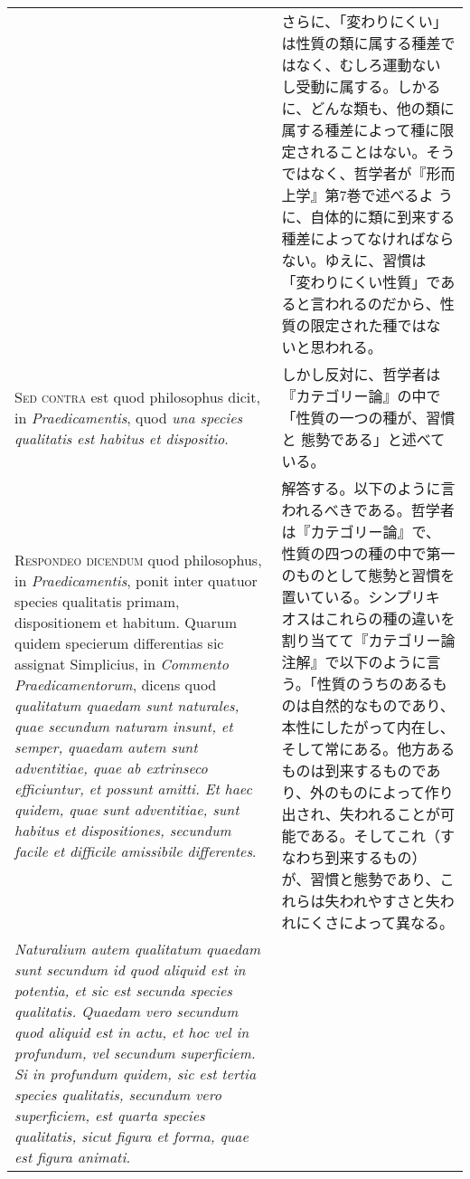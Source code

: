 \documentclass[10pt]{jsarticle} %
\begin{document}
\begin{longtable}{p{21em}p{21em}}
&

さらに、「変わりにくい」は性質の類に属する種差ではなく、むしろ運動ない
し受動に属する。しかるに、どんな類も、他の類に属する種差によって種に限
定されることはない。そうではなく、哲学者が『形而上学』第7巻で述べるよ
うに、自体的に類に到来する種差によってなければならない。ゆえに、習慣は
「変わりにくい性質」であると言われるのだから、性質の限定された種ではな
いと思われる。

\\



{\scshape Sed contra} est quod philosophus dicit, in {\itshape Praedicamentis}, quod {\itshape una
species qualitatis est habitus et dispositio}.

&

しかし反対に、哲学者は『カテゴリー論』の中で「性質の一つの種が、習慣と
態勢である」と述べている。

\\



{\scshape Respondeo dicendum} quod philosophus, in {\itshape Praedicamentis}, ponit inter
quatuor species qualitatis primam, dispositionem et habitum. Quarum
quidem specierum differentias sic assignat Simplicius, in {\itshape Commento
Praedicamentorum}, dicens quod {\itshape qualitatum quaedam sunt naturales, quae
secundum naturam insunt, et semper, quaedam autem sunt adventitiae,
quae ab extrinseco efficiuntur, et possunt amitti. Et haec quidem,
quae sunt adventitiae, sunt habitus et dispositiones, secundum facile
et difficile amissibile differentes}. 


&

解答する。以下のように言われるべきである。哲学者は『カテゴリー論』で、
性質の四つの種の中で第一のものとして態勢と習慣を置いている。シンプリキ
オスはこれらの種の違いを割り当てて『カテゴリー論注解』で以下のように言
う。「性質のうちのあるものは自然的なものであり、本性にしたがって内在し、
そして常にある。他方あるものは到来するものであり、外のものによって作り
出され、失われることが可能である。そしてこれ（すなわち到来するもの）
が、習慣と態勢であり、これらは失われやすさと失われにくさによって異なる。



\\



{\itshape Naturalium autem qualitatum
quaedam sunt secundum id quod aliquid est in potentia, et sic est
secunda species qualitatis. Quaedam vero secundum quod aliquid est in
actu, et hoc vel in profundum, vel secundum superficiem. Si in
profundum quidem, sic est tertia species qualitatis, secundum vero
superficiem, est quarta species qualitatis, sicut figura et forma,
quae est figura animati.} 



\end{longtable}
\end{document}
